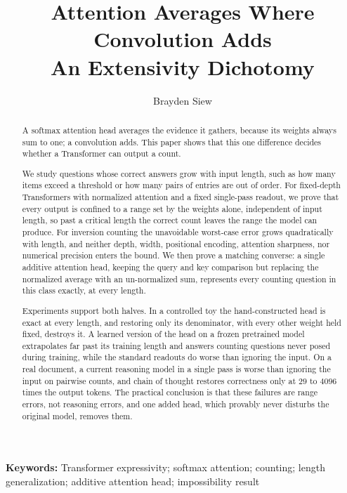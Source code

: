 \documentclass[10pt]{article}
\title{\bfseries Attention Averages Where Convolution Adds\\[2pt]
\large An Extensivity Dichotomy}
\author{Brayden Siew}
\date{}
\theoremstyle{definition}
\begin{document}
\maketitle
\thispagestyle{empty}

\begin{abstract}
A softmax attention head averages the evidence it gathers, because its
weights always sum to one; a convolution adds. This paper shows that this
one difference decides whether a Transformer can output a count.

We study questions whose correct answers grow with input length, such as
how many items exceed a threshold or how many pairs of entries are out of
order. For fixed-depth Transformers with normalized attention and a fixed
single-pass readout, we prove that every output is confined to a range set
by the weights alone, independent of input length, so past a critical
length the correct count leaves the range the model can produce. For
inversion counting the unavoidable worst-case error grows quadratically
with length, and neither depth, width, positional encoding, attention
sharpness, nor numerical precision enters the bound. We then prove a
matching converse: a single additive attention head, keeping the query and
key comparison but replacing the normalized average with an un-normalized
sum, represents every counting question in this class exactly, at every
length.

Experiments support both halves. In a controlled toy the hand-constructed
head is exact at every length, and restoring only its denominator, with
every other weight held fixed, destroys it. A learned version of the head
on a frozen pretrained model extrapolates far past its training length and
answers counting questions never posed during training, while the standard
readouts do worse than ignoring the input. On a real document, a current
reasoning model in a single pass is worse than ignoring the input on
pairwise counts, and chain of thought restores correctness only at $29$ to
$4096$ times the output tokens. The practical conclusion is that these
failures are range errors, not reasoning errors, and one added head, which
provably never disturbs the original model, removes them.
\end{abstract}

\vspace{6pt}
\noindent\textbf{Keywords:} Transformer expressivity; softmax attention;
counting; length generalization; additive attention head; impossibility
result

\newpage
\setcounter{tocdepth}{1}
\tableofcontents
\newpage
\end{document}
